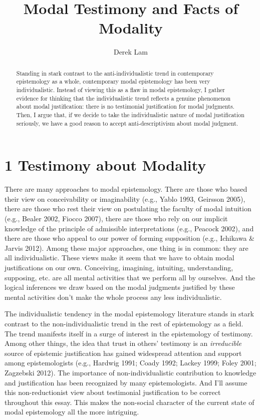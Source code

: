 \documentclass[a4paper,12pt]{article}
\title{\textbf{Modal Testimony and Facts of Modality}}
\author{Derek Lam}
\begin{document}
\maketitle

\begin{abstract}
Standing in stark contrast to the anti-individualistic trend in contemporary epistemology as a whole, contemporary modal epistemology has been very individualistic. Instead of viewing this as a flaw in modal epistemology, I gather evidence for thinking that the individualistic trend reflects a genuine phenomenon about modal justification: there is no testimonial justification for modal judgments. Then, I argue that, if we decide to take the individualistic nature of modal justification seriously, we have a good reason to accept anti-descriptivism about modal judgment.
\end{abstract}

\section*{1 Testimony about Modality}
There are many approaches to modal epistemology. There are those who based their view on conceivability or imaginability (e.g., Yablo 1993, Geirsson 2005), there are those who rest their view on postulating the faculty of modal intuition (e.g., Bealer 2002, Fiocco 2007), there are those who rely on our implicit knowledge of the principle of admissible interpretations (e.g., Peacock 2002), and there are those who appeal to our power of forming supposition (e.g., Ichikawa \& Jarvis 2012). Among these major approaches, one thing is in common: they are all individualistic. These views make it seem that we have to obtain modal justifications on our own. Conceiving, imagining, intuiting, understanding, supposing, etc. are all mental activities that we perform all by ourselves. And the logical inferences we draw based on the modal judgments justified by these mental activities don't make the whole process any less individualistic.

The individualistic tendency in the modal epistemology literature stands in stark contrast to the non-individualistic trend in the rest of epistemology as a field. The trend manifests itself in a surge of interest in the epistemology of testimony. Among other things, the idea that trust in others' testimony is an \emph{irreducible} source of epistemic justification has gained widespread attention and support among epistemologists (e.g., Hardwig 1991; Coady 1992; Lackey 1999; Foley 2001; Zagzebski 2012). The importance of non-individualistic contribution to knowledge and justification has been recognized by many epistemologists. And I'll assume this non-reductionist view about testimonial justification to be correct throughout this essay. This makes the non-social character of the current state of modal epistemology all the more intriguing.
\end{document}
